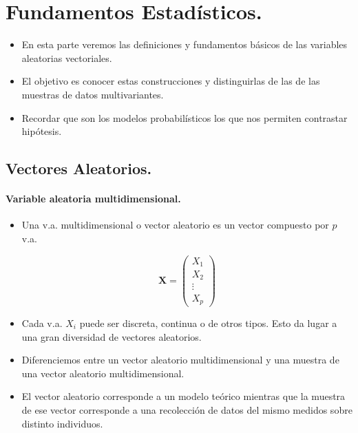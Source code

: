 


\chapter{Fundamentos Estadísticos.}

\begin{frame}
\begin{itemize}
\item En esta parte  veremos las definiciones y fundamentos básicos de las variables aleatorias vectoriales. 
\item El objetivo es conocer estas construcciones y distinguirlas de las de las muestras de datos multivariantes.
\item Recordar que son los modelos probabilísticos los que nos permiten contrastar hipótesis.
\end{itemize}
\end{frame}


\section{Vectores Aleatorios.}
\begin{frame}


\frametitle{Variable aleatoria multidimensional.}

\begin{itemize}
\item Una v.a. multidimensional o vector aleatorio es un vector compuesto por $p$ v.a.

$$\mathbf{X}=\begin{pmatrix}X_1\\ X_2\\ \vdots\\ X_p\end{pmatrix}$$

\item Cada v.a. $X_i$ puede ser discreta, continua o de otros tipos. Esto  da lugar  a una gran diversidad de vectores aleatorios.

\item Diferenciemos entre un vector aleatorio multidimensional y una muestra de una vector aleatorio multidimensional.

\item El vector aleatorio corresponde a un modelo teórico mientras que la muestra de ese vector corresponde a una recolección de datos del mismo medidos sobre distinto individuos.
\end{itemize}

\end{frame}

